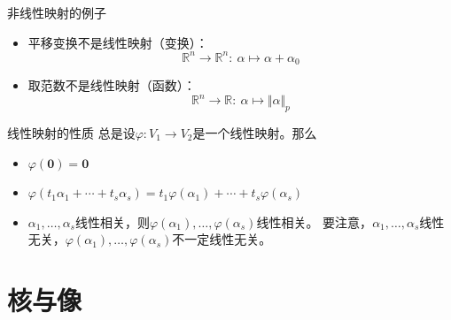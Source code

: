 
\begin{frame}

\begin{block}{非线性映射的例子}
\begin{itemize}
\item 平移变换不是线性映射（变换）：
\[\mathbb{R}^n \to \mathbb{R}^n: \ \alpha \mapsto \alpha + \alpha_0\]
\item 取范数不是线性映射（函数）：
\[\mathbb{R}^n \to \mathbb{R}: \ \alpha \mapsto \Vert\alpha\Vert_p\]
\end{itemize}
\end{block}

\end{frame}


\begin{frame}

\begin{block}{线性映射的性质}
总是设$\varphi: V_1 \to V_2$是一个线性映射。那么
\begin{itemize}
\item $\varphi(\mathbf{0}) = \mathbf{0}$
\item $\varphi(t_1\alpha_1 + \cdots + t_s\alpha_s) = t_1\varphi(\alpha_1) + \cdots + t_s\varphi(\alpha_s)$
\item $\alpha_1, \ldots, \alpha_s$线性相关，则$\varphi(\alpha_1), \ldots, \varphi(\alpha_s)$线性相关。\newline
要注意，$\alpha_1, \ldots, \alpha_s$线性无关，$\varphi(\alpha_1), \ldots, \varphi(\alpha_s)${\color{red}不一定}线性无关。
\end{itemize}
\end{block}

\end{frame}


\section{核与像}


